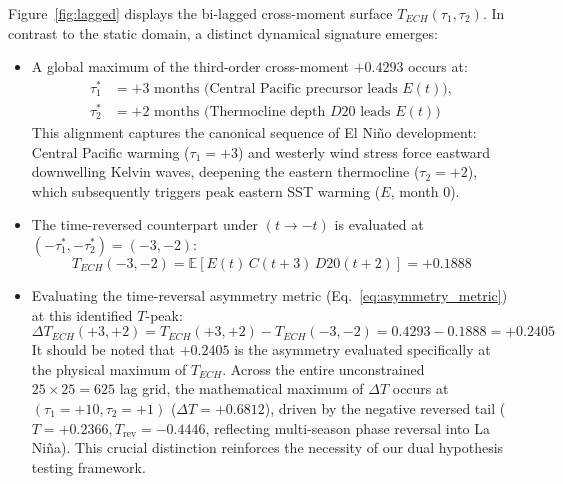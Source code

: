 \documentclass[11pt,a4paper]{article}
\begin{document}
Figure~\ref{fig:lagged} displays the bi-lagged cross-moment surface $T_{ECH}(\tau_1, \tau_2)$. In contrast to the static domain, a distinct dynamical signature emerges:
\begin{itemize}
    \item A global maximum of the third-order cross-moment \textbf{$+0.4293$} occurs at:
    \begin{align}
    \tau_1^* &= +3 \text{ months (Central Pacific precursor leads } E(t)), \nonumber \\
    \tau_2^* &= +2 \text{ months (Thermocline depth } D20 \text{ leads } E(t))
    \end{align}
    This alignment captures the canonical sequence of El Ni\~no development: Central Pacific warming ($\tau_1 = +3$) and westerly wind stress force eastward downwelling Kelvin waves, deepening the eastern thermocline ($\tau_2 = +2$), which subsequently triggers peak eastern SST warming ($E$, month 0).
    \item The time-reversed counterpart under $(t \to -t)$ is evaluated at $(-\tau_1^*, -\tau_2^*) = (-3, -2)$:
    \begin{equation}
    T_{ECH}(-3, -2) = \mathbb{E}[E(t) \, C(t+3) \, D20(t+2)] = +0.1888
    \end{equation}
    \item Evaluating the time-reversal asymmetry metric (Eq.~\ref{eq:asymmetry_metric}) at this identified $T$-peak:
    \begin{equation}
    \Delta T_{ECH}(+3, +2) = T_{ECH}(+3, +2) - T_{ECH}(-3, -2) = 0.4293 - 0.1888 = \mathbf{+0.2405}
    \end{equation}
    It should be noted that $+0.2405$ is the asymmetry evaluated specifically at the physical maximum of $T_{ECH}$. Across the entire unconstrained $25 \times 25 = 625$ lag grid, the mathematical maximum of $\Delta T$ occurs at $(\tau_1 = +10, \tau_2 = +1)$ ($\Delta T = +0.6812$), driven by the negative reversed tail ($T = +0.2366, T_{\text{rev}} = -0.4446$, reflecting multi-season phase reversal into La Ni\~na). This crucial distinction reinforces the necessity of our dual hypothesis testing framework.
\end{itemize}
\end{document}
